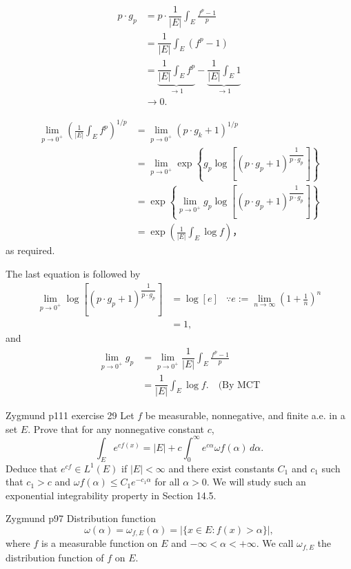 \documentclass[UTF8,a4paper,10pt]{article}
\begin{document}
\begin{align*}
  p\cdot g_p 
  &= p\cdot\dfrac{1}{|E|}\int_E \frac{f^p-1}{p}\\
  &= \dfrac{1}{|E|}\int_E (f^p-1)\\
  &= \underset{\to 1}{\underbrace{\dfrac{1}{|E|}\int_E f^p} } -  \underset{\to 1}{\underbrace{\dfrac{1}{|E|}\int_E 1 }}\\
  &\to 0.
\end{align*}

\begin{align*}
  \lim_{{p \to 0^+}} \left( \frac{1}{|E|} \int_E f^p  \right)^{1/p}  &=  \lim_{{p \to 0^+}} \left( p\cdot g_k +1\right)^{1/p}  \\
  &= \lim_{{p \to 0^+}} \exp\left\{g_p\log\left[(p \cdot g_p + 1)^{\dfrac{1}{p\cdot g_p}}\right]\right\}\\
  &=  \exp\left\{ \lim_{{p \to 0^+}} g_p\log\left[(p \cdot g_p + 1)^{\dfrac{1}{p\cdot g_p}}\right]\right\}\\
  &= \exp\left(\frac{1}{|E|} \int_E \log f \right)，
\end{align*}
as required.

The last equation is followed by
\begin{align*}
  \lim_{{p \to 0^+}} \log\left[(p \cdot g_p + 1)^{\dfrac{1}{p\cdot g_p}}\right] &= \log[e] & \because e := \lim_{n\to\infty}\left(1+\frac{1}{n}\right)^n \\
  &= 1,
\end{align*}
and
\begin{align*}
  \lim_{{p \to 0^+}} g_p 
  &= \lim_{{p \to 0^+}} \dfrac{1}{|E|}\int_E \frac{f^p-1}{p} \\
  &= \dfrac{1}{|E|}\int_E \log f. \quad\text{(By MCT}
\end{align*}

\pagebreak

\begin{Problem}[]{Zygmund p111 exercise 29}
  Let $f$ be measurable, nonnegative, and finite a.e. in a set $E$. Prove that for any nonnegative constant $c$,
\[
\int_E e^{cf(x)}  = |E| + c \int_0^\infty e^{c\alpha} \omega f(\alpha) \,d\alpha.
\]
Deduce that $e^{cf} \in L^1(E)$ if $|E| < \infty$ and there exist constants $C_1$ and $c_1$ such that $c_1 > c$ and $\omega f(\alpha) \leq C_1e^{-c_1\alpha}$ for all $\alpha > 0$. We will study such an exponential integrability property in Section 14.5.

\end{Problem}


\begin{mybox}{Zygmund p97 Distribution function}
  \begin{equation*}
    \omega(\alpha) = \omega_{f,E}(\alpha) = \left| \{ x \in E : f(x) > \alpha \} \right|,
    \end{equation*}
    where \(f\) is a measurable function on \(E\) and \(-\infty < \alpha < +\infty\). We call \(\omega_{f,E}\) the distribution function of \(f\) on \(E\).
    
\end{mybox}
\end{document}
